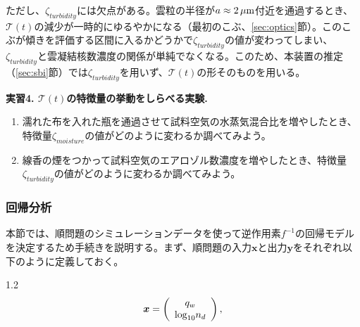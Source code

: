 \documentclass{ltjsarticle}
\begin{document}
ただし、$\zeta_{turbidity}$には欠点がある。雲粒の半径が$a\approx2\,\rm \mu m$付近を通過するとき、$\mathcal{T}(t)$の減少が一時的にゆるやかになる（最初のこぶ、\ref{sec:optics}節）。このこぶが傾きを評価する区間に入るかどうかで$\zeta_{turbidity}$の値が変わってしまい、$\zeta_{turbidity}$と雲凝結核数濃度の関係が単純でなくなる。このため、本装置の推定（\ref{sec:sbi}節）では$\zeta_{turbidity}$を用いず、$\mathcal{T}(t)$の形そのものを用いる。
\\
\begin{itembox}[l]{\bf{実習4. $\mathcal{T}(t)$の特徴量の挙動をしらべる実験.}}
\begin{enumerate}
\item 濡れた布を入れた瓶を通過させて試料空気の水蒸気混合比を増やしたとき、特徴量$\zeta_{moisture}$の値がどのように変わるか調べてみよう。
\item 線香の煙をつかって試料空気のエアロゾル数濃度を増やしたとき、特徴量$\zeta_{turbidity}$の値がどのように変わるか調べてみよう。
\end{enumerate}
\end{itembox}

\subsubsection{回帰分析}
本節では、順問題のシミュレーションデータを使って逆作用素$f^{-1}$の回帰モデルを決定するため手続きを説明する。まず、順問題の入力$\bm{x}$と出力$\bm{y}$をそれぞれ以下のように定義しておく。
\begin{spacing}{1.2} 
\begin{equation}\label{eq:119}
\bm{x}= \left(
    \begin{array}{c}
      q_{w} \\
      {\rm log}_{10}n_d \\
    \end{array}
  \right),
\end{equation}
\end{spacing}
\end{document}
